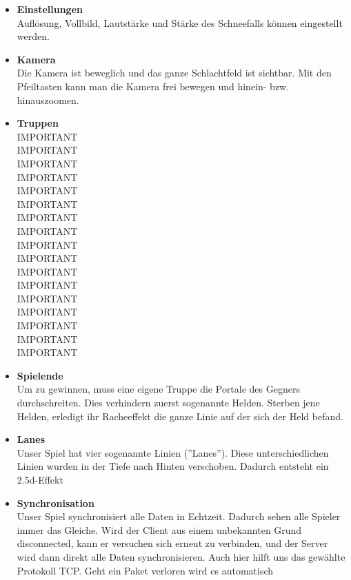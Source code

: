 \begin{itemize}
\begin{itemize}
        \end{itemize}
    \item \textbf{Einstellungen} \\
        Auflösung, Vollbild, Lautstärke und Stärke des Schneefalls können eingestellt werden.
    \item \textbf{Kamera} \\
        Die Kamera ist beweglich und das ganze Schlachtfeld ist sichtbar. Mit den Pfeiltasten kann man die Kamera frei bewegen und hinein- bzw. hinauszoomen.
    \item \textbf{Truppen} \\
        IMPORTANT\\
        IMPORTANT\\
        IMPORTANT\\
        IMPORTANT\\
        IMPORTANT\\
        IMPORTANT\\
        IMPORTANT\\
        IMPORTANT\\
        IMPORTANT\\
        IMPORTANT\\
        IMPORTANT\\
        IMPORTANT\\
        IMPORTANT\\
        IMPORTANT\\
        IMPORTANT\\
        IMPORTANT\\
        IMPORTANT\\
    \item \textbf{Spielende} \\
        Um zu gewinnen, muss eine eigene Truppe die Portale des Gegners durchschreiten. Dies verhindern zuerst sogenannte Helden. Sterben jene Helden, erledigt ihr Racheeffekt die
        ganze Linie auf der sich der Held befand.
    \item \textbf{Lanes} \\
        Unser Spiel hat vier sogenannte Linien (''Lanes''). Diese unterschiedlichen Linien wurden in der Tiefe nach Hinten verschoben. Dadurch entsteht ein 2.5d-Effekt
    \item \textbf{Synchronisation} \\
        Unser Spiel synchronisiert alle Daten in Echtzeit. Dadurch sehen alle Spieler immer das Gleiche. Wird der Client aus einem unbekannten Grund disconnected, kann er versuchen
        sich erneut zu verbinden, und der Server wird dann direkt alle Daten synchronisieren. Auch hier hilft uns das gewählte Protokoll TCP. Geht ein Paket verloren wird es automatisch

\end{itemize}
